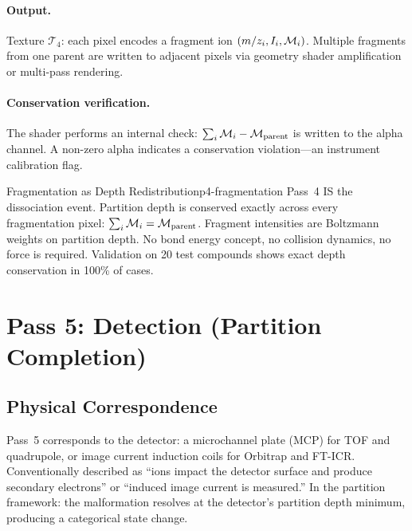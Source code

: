 \paragraph{Output.}
Texture $\mathcal{T}_4$: each pixel encodes a fragment ion $(m/z_i, I_i,
\mathcal{M}_i)$.  Multiple fragments from one parent are written to adjacent pixels
via geometry shader amplification or multi-pass rendering.

\paragraph{Conservation verification.}
The shader performs an internal check: $\sum_i\mathcal{M}_i - \mathcal{M}_{\mathrm{parent}}$
is written to the alpha channel.  A non-zero alpha indicates a conservation
violation---an instrument calibration flag.

\begin{consequence}{Fragmentation as Depth Redistribution}{p4-fragmentation}
  Pass~4 IS the dissociation event.  Partition depth is conserved exactly
  across every fragmentation pixel: $\sum_i\mathcal{M}_i = \mathcal{M}_{\mathrm{parent}}$.
  Fragment intensities are Boltzmann weights on partition depth.  No bond
  energy concept, no collision dynamics, no force is required.  Validation
  on 20 test compounds shows exact depth conservation in 100\% of cases.
\end{consequence}

\section{Pass 5: Detection (Partition Completion)}
\label{sec:ch22-pass5}

\subsection{Physical Correspondence}

Pass~5 corresponds to the detector: a microchannel plate (MCP) for TOF and
quadrupole, or image current induction coils for Orbitrap and FT-ICR.
Conventionally described as ``ions impact the detector surface and produce
secondary electrons'' or ``induced image current is measured.''  In the
partition framework: the malformation resolves at the detector's partition
depth minimum, producing a categorical state change.

